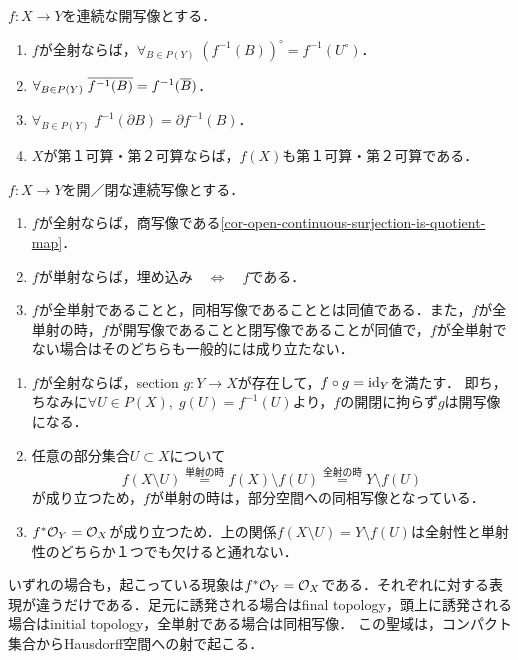 \documentclass[uplatex,dvipdfmx]{jsreport}
\begin{document}
\begin{proposition}[連続開写像の性質]
    $f:X\to Y$を連続な開写像とする．
    \begin{enumerate}
        \item $f$が全射ならば，$\forall_{B\in P(Y)}\;(f^{-1}(B))^\circ=f^{-1}(U^\circ)$．
        \item $\forall_{B\in P(Y)}\;\overline{f^{-1}(B)}=f^{-1}(\overline{B})$．
        \item $\forall_{B\in P(Y)}\;f^{-1}(\partial B)=\partial f^{-1}(B)$．
        \item $X$が第１可算・第２可算ならば，$f(X)$も第１可算・第２可算である．
    \end{enumerate}
\end{proposition}

\begin{theorem}
    $f:X\to Y$を開／閉な連続写像とする．
    \begin{enumerate}
        \item $f$が全射ならば，商写像である\ref{cor-open-continuous-surjection-is-quotient-map}．
        \item $f$が単射ならば，埋め込み$\quad\Leftrightarrow\quad f$である．
        \item $f$が全単射であることと，同相写像であることとは同値である．また，$f$が全単射の時，$f$が開写像であることと閉写像であることが同値で，$f$が全単射でない場合はそのどちらも一般的には成り立たない．
    \end{enumerate}
\end{theorem}
\begin{Proof}\mbox{}
    \begin{enumerate}
        \item $f$が全射ならば，section $g:Y\to X$が存在して，$f\circ g=\mathrm{id}_Y$を満たす．
        即ち，
        ちなみに$\forall U\in P(X),\;g(U)=f^{-1}(U)$より，$f$の開閉に拘らず$g$は開写像になる．
        \item 任意の部分集合$U\subset X$について\[f(X\setminus U)\overset{単射の時}{=}f(X)\setminus f(U)\overset{全射の時}{=}Y\setminus f(U)\]
        が成り立つため，$f$が単射の時は，部分空間への同相写像となっている．
        \item $f^*\mathcal{O}_Y=\mathcal{O}_X$が成り立つため．上の関係$f(X\setminus U)=Y\setminus f(U)$は全射性と単射性のどちらか１つでも欠けると通れない．
    \end{enumerate}
\end{Proof}
\begin{remarks}
    いずれの場合も，起こっている現象は$f^*\mathcal{O}_Y=\mathcal{O}_X$である．それぞれに対する表現が違うだけである．足元に誘発される場合はfinal topology，頭上に誘発される場合はinitial topology，全単射である場合は同相写像．
    この聖域は，コンパクト集合からHausdorff空間への射で起こる．
\end{remarks}
\end{document}
